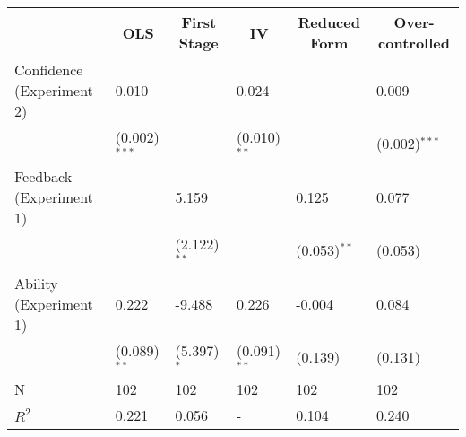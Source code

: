 %
\begin{tabular*}{\textwidth}{@{\extracolsep{\fill}}llllll}\hline\hline
\multicolumn{1}{l}{}&\multicolumn{1}{c}{OLS}&\multicolumn{1}{c}{First Stage}&\multicolumn{1}{c}{IV}&\multicolumn{1}{c}{Reduced Form}&\multicolumn{1}{c}{Over-controlled}\tabularnewline
\hline
Confidence (Experiment 2)&0.010&&0.024&&0.009\tabularnewline
&{\scriptsize (0.002)$^{***}$}&&{\scriptsize (0.010)$^{**}$}&&{\scriptsize (0.002)$^{***}$}\tabularnewline
Feedback (Experiment 1)&&5.159&&0.125&0.077\tabularnewline
&&{\scriptsize (2.122)$^{**}$}&&{\scriptsize (0.053)$^{**}$}&{\scriptsize (0.053)$^{}$}\tabularnewline
Ability (Experiment 1)&0.222&-9.488&0.226&-0.004&0.084\tabularnewline
&{\scriptsize (0.089)$^{**}$}&{\scriptsize (5.397)$^{*}$}&{\scriptsize (0.091)$^{**}$}&{\scriptsize (0.139)$^{}$}&{\scriptsize (0.131)$^{}$}\tabularnewline
N&102&102&102&102&102\tabularnewline
$R^2$&0.221&0.056&-&0.104&0.240\tabularnewline
\hline
\end{tabular*}

